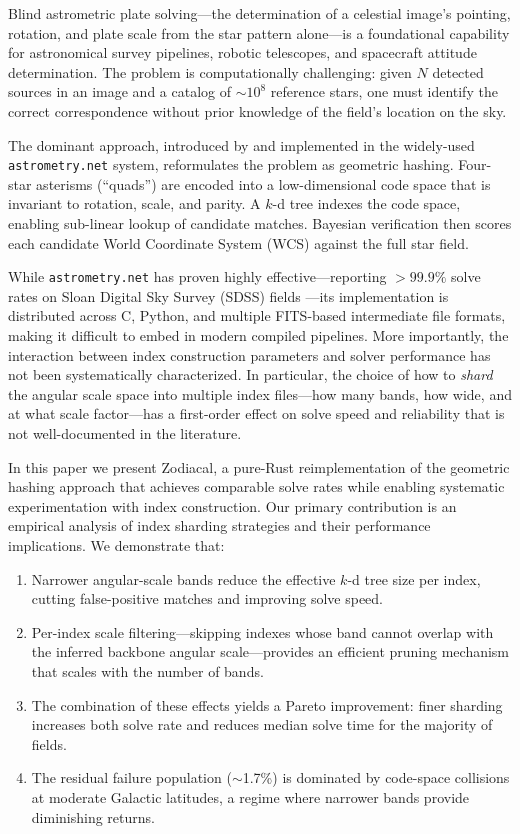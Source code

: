 \documentclass[twocolumn, 10pt]{article}
\begin{document}
Blind astrometric plate solving---the determination of a celestial image's
pointing, rotation, and plate scale from the star pattern alone---is a
foundational capability for astronomical survey pipelines, robotic telescopes,
and spacecraft attitude determination. The problem is computationally
challenging: given $N$ detected sources in an image and a catalog of $\sim10^8$
reference stars, one must identify the correct correspondence without prior
knowledge of the field's location on the sky.

The dominant approach, introduced by \citet{lang2010} and implemented in the
widely-used \texttt{astrometry.net} system, reformulates the problem as
geometric hashing. Four-star asterisms (``quads'') are encoded into a
low-dimensional code space that is invariant to rotation, scale, and parity.
A $k$-d tree indexes the code space, enabling sub-linear lookup of candidate
matches. Bayesian verification then scores each candidate World Coordinate
System (WCS) against the full star field.

While \texttt{astrometry.net} has proven highly effective---reporting
$>99.9\%$ solve rates on Sloan Digital Sky Survey (SDSS) fields
\citep{lang2010}---its implementation is distributed across C, Python, and
multiple FITS-based intermediate file formats, making it difficult to embed in
modern compiled pipelines. More importantly, the interaction between index
construction parameters and solver performance has not been systematically
characterized. In particular, the choice of how to \emph{shard} the angular
scale space into multiple index files---how many bands, how wide, and at what
scale factor---has a first-order effect on solve speed and reliability that is
not well-documented in the literature.

In this paper we present Zodiacal, a pure-Rust reimplementation of the
geometric hashing approach that achieves comparable solve rates while enabling
systematic experimentation with index construction. Our primary contribution
is an empirical analysis of index sharding strategies and their performance
implications. We demonstrate that:

\begin{enumerate}
    \item Narrower angular-scale bands reduce the effective $k$-d tree size
          per index, cutting false-positive matches and improving solve speed.
    \item Per-index scale filtering---skipping indexes whose band cannot
          overlap with the inferred backbone angular scale---provides an
          efficient pruning mechanism that scales with the number of bands.
    \item The combination of these effects yields a Pareto improvement:
          finer sharding increases both solve rate and reduces median solve
          time for the majority of fields.
    \item The residual failure population ($\sim$1.7\%) is dominated by
          code-space collisions at moderate Galactic latitudes, a regime
          where narrower bands provide diminishing returns.
\end{enumerate}
\end{document}
